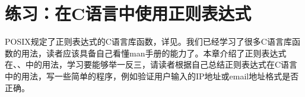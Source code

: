 
\section{练习：在C语言中使用正则表达式}
%
POSIX规定了正则表达式的C语言库函数，详见。我们已经学习了很多C语言库函数的用法，读者应该具备自己看懂man手册的能力了。本章介绍了正则表达式在、、中的用法，学习要能够举一反三，请读者根据自己总结正则表达式在C语言中的用法，写一些简单的程序，例如验证用户输入的IP地址或email地址格式是否正确。

